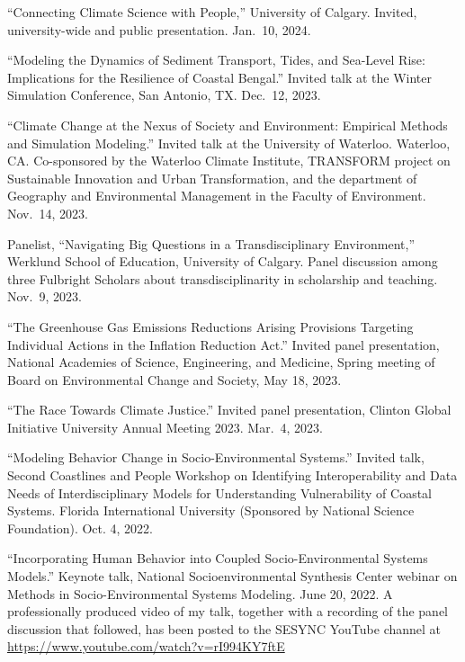 %
%
\item ``Connecting Climate Science with People,'' University of Calgary. Invited, university-wide and public presentation. Jan.~10, 2024.
\item ``Modeling the Dynamics of Sediment Transport, Tides, and Sea-Level Rise: Implications for the Resilience of Coastal Bengal.'' Invited talk at the Winter Simulation Conference, San Antonio, TX. Dec.~12, 2023.
\item ``Climate Change at the Nexus of Society and Environment: Empirical Methods and Simulation Modeling.''
  Invited talk at the University of Waterloo. Waterloo, CA.
  Co-sponsored by the Waterloo Climate Institute, TRANSFORM project on Sustainable Innovation and Urban Transformation, and the department of Geography and Environmental Management in the Faculty of Environment.
  Nov.~14, 2023.
\item Panelist, ``Navigating Big Questions in a Transdisciplinary Environment,'' Werklund
  School of Education, University of Calgary. Panel discussion among three Fulbright 
  Scholars about transdisciplinarity in scholarship and teaching.
  Nov.~9, 2023.
\item ``The Greenhouse Gas Emissions Reductions Arising Provisions Targeting
        Individual Actions in the Inflation Reduction Act.''
   Invited panel presentation, National Academies of Science, Engineering,
   and Medicine, Spring meeting of Board on Environmental Change and
   Society, May 18, 2023.
\item ``The Race Towards Climate Justice.''
   Invited panel presentation, Clinton Global Initiative University
   Annual Meeting 2023. Mar.~4, 2023.
\item ``Modeling Behavior Change in Socio-Environmental Systems.''
   Invited talk, Second Coastlines and People Workshop on Identifying Interoperability and Data Needs of Interdisciplinary Models for
   Understanding Vulnerability of Coastal Systems. Florida International
   University (Sponsored by National Science Foundation). Oct. 4, 2022.
\item ``Incorporating Human Behavior into Coupled Socio-Environmental Systems
   Models.'' Keynote talk, National Socioenvironmental Synthesis Center
   webinar on Methods in Socio-Environmental Systems Modeling.
   June 20, 2022. A professionally produced video of my talk, together with a
   recording of the panel discussion that followed, has been posted to the
   SESYNC YouTube channel at \url{https://www.youtube.com/watch?v=rI994KY7ftE}
